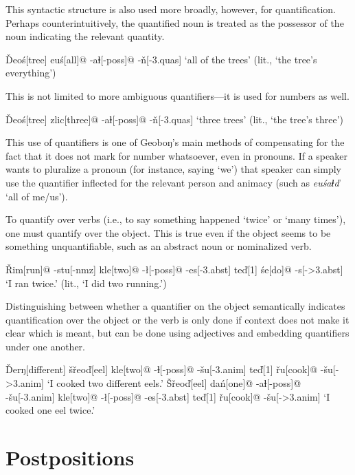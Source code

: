 \documentclass[a4paper,11pt,oneside,openany]{memoir}
\newcommand{\vd}{ď}
\newcommand{\vs}{š}
\newcommand{\vr}{ř}
\newcommand{\vn}{ň}
\newcommand{\vD}{Ď}
\newcommand{\vS}{Š}
\newcommand{\vR}{Ř}
\newcommand{\dbl}{ⱡ}
\newcommand{\engma}{ŋ}
\begin{document}
This syntactic structure is also used more broadly, however, for quantification. Perhaps counterintuitively, the quantified noun is treated as the possessor of the noun indicating the relevant quantity.

\ex
\begingl
\vD eo\'s[tree]
eu\'s[all]@
-a\dbl[\sc -poss]@
-\vn[\sc -3.quas]
\glft `all of the trees' (lit., `the tree's everything')
\endgl
\xe

This is not limited to more ambiguous quantifiers---it is used for numbers as well.

\ex
\begingl
\vD eo\'s[tree]
zlic[three]@
-a\dbl[\sc -poss]@
-\vn[\sc -3.quas]
\glft `three trees' (lit., `the tree's three')
\endgl
\xe

This use of quantifiers is one of Geobo{\engma}'s main methods of compensating for the fact that it does not mark for number whatsoever, even in pronouns. If a speaker wants to pluralize a pronoun (for instance, saying `we') that speaker can simply use the quantifier inflected for the relevant person and animacy (such as \textit{eu\'sa\dbl\vd} `all of me/us').

To quantify over verbs (i.e., to say something happened `twice' or `many times'), one must quantify over the object. This is true even if the object seems to be something unquantifiable, such as an abstract noun or nominalized verb.

\ex
\begingl
\vR im[run]@
-stu[\sc -nmz]
kle[two]@
-\l[\sc -poss]@
-es[\sc -3.abst]
te{\vd}[1]
\'se[do]@
-s[\sc ->3.abst]
\glft `I ran twice.' (lit., `I did two running.')
\endgl
\xe

Distinguishing between whether a quantifier on the object semantically indicates quantification over the object or the verb is only done if context does not make it clear which is meant, but can be done using adjectives and embedding quantifiers under one another.

\pex
\a
\begingl
\vD er\engma[different]
\vs\vr eo\vd[eel]
kle[two]@
-\dbl[-{\sc poss}]@
-\vs u[\sc -3.anim]
te\vd[1]
\vr u[cook]@
-\vs u[\sc ->3.anim]
\glft `I cooked two different eels.'
\endgl
\a
\begingl
\vS\vr eo\vd[eel]
da\'n[one]@
-a\dbl[\sc -poss]@
-\vs u[\sc -3.anim]
kle[two]@
-\l[\sc -poss]@
-es[\sc -3.abst]
te\vd[1]
\vr u[cook]@
-\vs u[\sc ->3.anim]
\glft `I cooked one eel twice.'
\endgl
\xe

\section{Postpositions}
\end{document}
